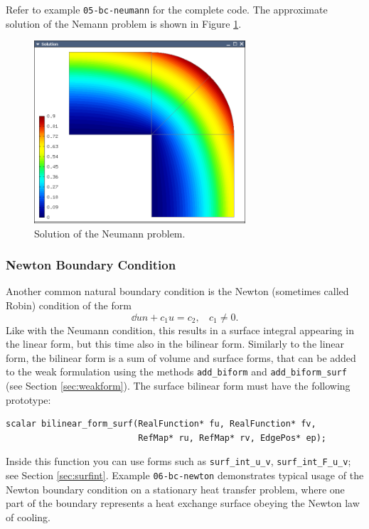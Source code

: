 Refer to example {\tt 05-bc-neumann} for the complete code. The approximate solution
of the Nemann problem is shown in Figure \ref{fig:neumann}.

\begin{figure}[ht]
  \centering\medskip
  \includegraphics[width=0.7\textwidth]{img/neumann.png}
  \caption{Solution of the Neumann problem.}
  \label{fig:neumann}
\end{figure}


\subsubsection{Newton Boundary Condition}

Another common natural boundary condition is the Newton (sometimes called Robin) condition
of the form
$$\dd{u}{n} + c_1 u = c_2, \ \ \ \ c_1 \ne 0.$$
Like with the Neumann condition, this results in a surface integral appearing in the linear form,
but this time also in the bilinear form. Similarly to the linear form, the bilinear form is
a sum of volume and surface forms, that can be added to the weak formulation using the methods
{\tt add\_biform} and {\tt add\_biform\_surf} (see Section \ref{sec:weakform}).
The surface bilinear form must have the following prototype:

\begin{lstlisting}
scalar bilinear_form_surf(RealFunction* fu, RealFunction* fv,
                          RefMap* ru, RefMap* rv, EdgePos* ep);
\end{lstlisting}

Inside this function you can use forms such as \verb"surf_int_u_v", \verb"surf_int_F_u_v"; see
Section \ref{sec:surfint}. Example {\tt 06-bc-newton} demonstrates typical usage of the Newton
boundary condition on a stationary heat transfer problem, where one part of the boundary
represents a heat exchange surface obeying the Newton law of cooling.



